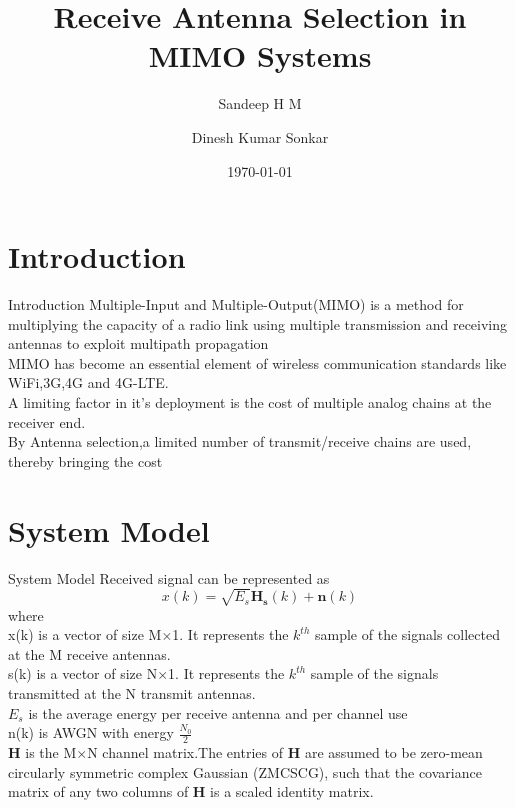 \documentclass{beamer}
\title{Receive Antenna Selection in MIMO Systems}
\author{Sandeep H M \and Dinesh Kumar Sonkar}
\date{\today}
\begin{document}
\begin{frame}
  \titlepage
\end{frame}

\section{Introduction}
\begin{frame}{Introduction}
Multiple-Input and Multiple-Output(MIMO) is a method for multiplying the capacity of a radio link using multiple transmission and receiving antennas to exploit multipath propagation\\
\vskip 0.2in
MIMO has become an essential element of wireless communication standards like WiFi,3G,4G and 4G-LTE.\\
\vskip 0.2in
A limiting factor in it's deployment is the cost of multiple analog chains at the receiver end.\\
\vskip 0.2in
By Antenna selection,a limited number of transmit/receive chains are used, thereby bringing the cost
    
\end{frame}

\section{System Model}
\begin{frame}{System Model}
Received signal can be represented as 
\begin{equation*}
    x(k) =\sqrt{E_s}\boldsymbol{H_s}(k)+ \boldsymbol{n}(k)
\end{equation*}
where\\
x(k) is a vector of size M$\times$1. It represents the $k^{th}$ sample of the signals collected at the M receive antennas.\\
\vskip 0.1in
s(k) is a vector of size N$\times$1. It represents the $k^{th}$ sample of the signals transmitted at the N transmit antennas.\\
\vskip 0.1in
$E_s$ is the average energy per receive antenna and per channel use\\
\vskip 0.1in
n(k)  is AWGN with energy $\frac{N_0}{2}$\\
\vskip 0.1in
\textbf{H} is the M$\times$N channel matrix.The entries of \textbf{H} are assumed to be zero-mean circularly symmetric complex Gaussian (ZMCSCG), such that the covariance matrix of any two columns of \textbf{H} is a scaled identity matrix.
\end{frame}
\end{document}
